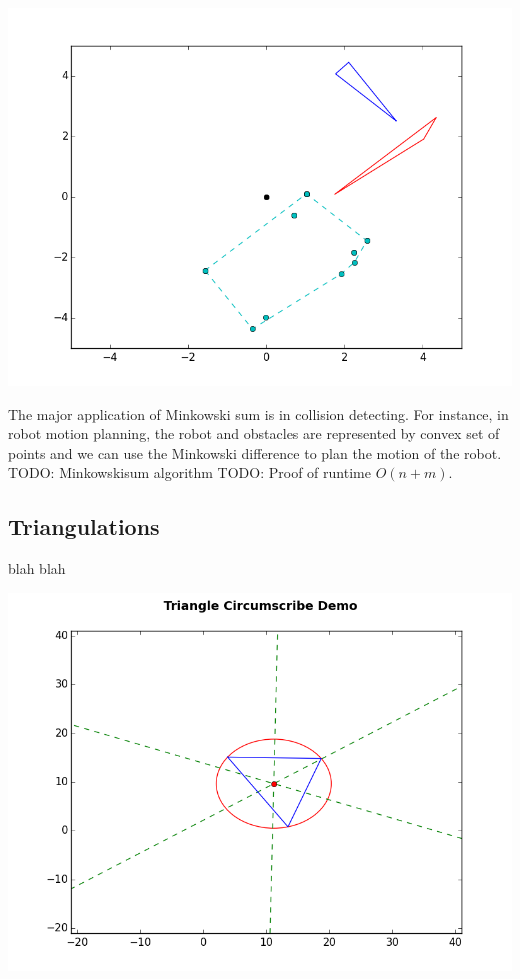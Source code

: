 \documentclass[12pt]{article}
\begin{document}
\begin{multicols}{2}
\centerline{\includegraphics[scale=0.4]{minkowski_noncolliding.png}}
\indent The major application of Minkowski sum is in collision detecting. For instance, in robot motion planning, the robot and obstacles are represented by convex set of points and we can use the Minkowski difference to plan the motion of the robot. \newline
\indent TODO: Minkowskisum algorithm \newline
\indent TODO: Proof of runtime $O(n+m)$. \newline

\subsection{Triangulations}
\indent blah blah \newline \\
\centerline{\includegraphics[scale=0.4]{triangle_circumscribe.png}}
\end{multicols}
\end{document}
